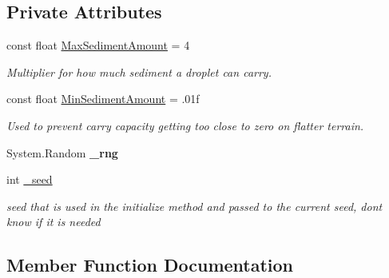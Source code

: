 \subsection*{Private Attributes}
\begin{DoxyCompactItemize}
\item 
\mbox{\label{class_assets_1_1_scripts_1_1_erosion_a2fd2d7a586583b867495c96570f27f6b}} 
const float \mbox{\hyperlink{class_assets_1_1_scripts_1_1_erosion_a2fd2d7a586583b867495c96570f27f6b}{Max\+Sediment\+Amount}} = 4
\begin{DoxyCompactList}\small\item\em Multiplier for how much sediment a droplet can carry. \end{DoxyCompactList}\item 
\mbox{\label{class_assets_1_1_scripts_1_1_erosion_aedca88fa942fd3f1d2dc7a7cc3c721db}} 
const float \mbox{\hyperlink{class_assets_1_1_scripts_1_1_erosion_aedca88fa942fd3f1d2dc7a7cc3c721db}{Min\+Sediment\+Amount}} = .\+01f
\begin{DoxyCompactList}\small\item\em Used to prevent carry capacity getting too close to zero on flatter terrain. \end{DoxyCompactList}\item 
\mbox{\label{class_assets_1_1_scripts_1_1_erosion_af598a320566103384924f9f2500204ac}} 
System.\+Random {\bfseries \+\_\+rng}
\item 
\mbox{\label{class_assets_1_1_scripts_1_1_erosion_a7e37675e7d5a2fa8422fa2409bf37e21}} 
int \mbox{\hyperlink{class_assets_1_1_scripts_1_1_erosion_a7e37675e7d5a2fa8422fa2409bf37e21}{\+\_\+seed}}
\begin{DoxyCompactList}\small\item\em seed that is used in the initialize method and passed to the current seed, don\textquotesingle{}t know if it is needed \end{DoxyCompactList}\end{DoxyCompactItemize}


\subsection{Member Function Documentation}
\mbox{\label{class_assets_1_1_scripts_1_1_erosion_a7c26866a0dce3f28f17e8736c0e8e968}} 
